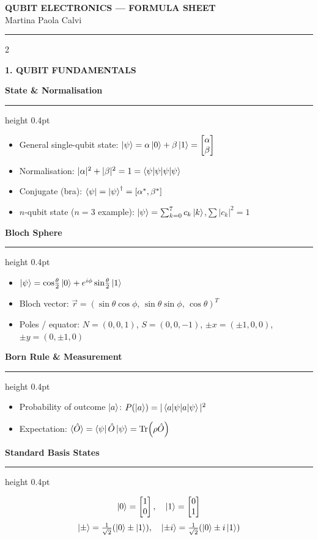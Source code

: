 \documentclass[10pt,a4paper]{article}
\newcommand{\sectionbox}[1]{%
  \vspace{3pt}%
  \noindent\colorbox{headerbg}{\parbox{\linewidth-2\fboxsep}%
    {\bfseries\small\color{white}\MakeUppercase{#1}}}%
  \vspace{1pt}%
}
\newcommand{\subsec}[1]{%
  \vspace{3pt}%
  {\small\bfseries\color{subseccolor}#1}%
  \vspace{1pt}\hrule height 0.4pt \vspace{2pt}%
}
\begin{document}
\begin{center}
  {\large\bfseries\color{headerbg} QUBIT ELECTRONICS — FORMULA SHEET}\\[1pt]
  {\small Martina Paola Calvi}
\end{center}
\vspace{-2pt}
\noindent\textcolor{rulecolor}{\rule{\linewidth}{1pt}}
\vspace{2pt}

\begin{multicols}{2}

\sectionbox{1. Qubit Fundamentals}

\subsec{State \& Normalisation}
\begin{itemize}
  \item General single-qubit state: $\ket{\psi} = \alpha\ket{0}+\beta\ket{1} = \begin{bmatrix}\alpha\\\beta\end{bmatrix}$
  \item Normalisation: $|\alpha|^2+|\beta|^2 = 1 = \braket{\psi|\psi}$
  \item Conjugate (bra): $\bra{\psi} = \ket{\psi}^\dagger = [\alpha^*,\beta^*]$
  \item $n$-qubit state ($n=3$ example): $\ket{\psi}=\sum_{k=0}^{7}c_k\ket{k}$,\quad $\sum|c_k|^2=1$
\end{itemize}

\subsec{Bloch Sphere}
\begin{itemize}
  \item $\ket{\psi}=\cos\!\tfrac{\theta}{2}\ket{0}+e^{i\phi}\sin\!\tfrac{\theta}{2}\ket{1}$
  \item Bloch vector: $\vec{r}=(\sin\theta\cos\phi,\,\sin\theta\sin\phi,\,\cos\theta)^T$
  \item Poles / equator: $N=(0,0,1)$, $S=(0,0,-1)$, $\pm x=(\pm1,0,0)$, $\pm y=(0,\pm1,0)$
\end{itemize}

\subsec{Born Rule \& Measurement}
\begin{itemize}
  \item Probability of outcome $\ket{a}$: $P(\ket{a})=|\braket{a|\psi}|^2$
  \item Expectation: $\langle\hat{O}\rangle=\bra{\psi}\hat{O}\ket{\psi}=\Tr(\rho\hat{O})$
\end{itemize}

\subsec{Standard Basis States}
\[
\ket{0}=\begin{bmatrix}1\\0\end{bmatrix},\quad
\ket{1}=\begin{bmatrix}0\\1\end{bmatrix}
\]
\[
\ket{\pm}=\tfrac{1}{\sqrt{2}}(\ket{0}\pm\ket{1}),\quad
\ket{\pm i}=\tfrac{1}{\sqrt{2}}(\ket{0}\pm i\ket{1})
\]


\end{multicols}
\end{document}

